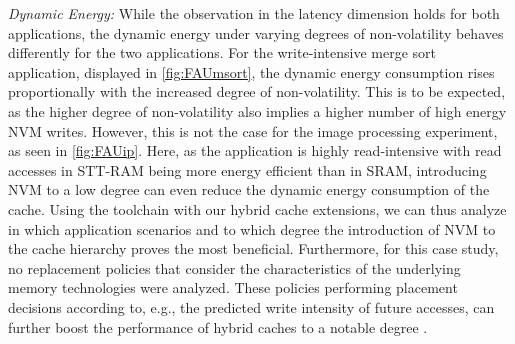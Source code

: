 \textit{Dynamic Energy:} While the observation in the latency dimension holds for both applications, the dynamic energy under varying degrees of non-volatility behaves differently for the two applications.
For the write-intensive merge sort application, displayed in \cref{fig:FAUmsort}, the dynamic energy consumption rises proportionally with the increased degree of non-volatility.
This is to be expected, as the higher degree of non-volatility also implies a higher number of high energy NVM writes.
However, this is not the case for the image processing experiment, as seen in \cref{fig:FAUip}.
Here, as the application is highly read-intensive with read accesses in STT-RAM being more energy efficient than in SRAM, introducing NVM to a low degree can even reduce the dynamic energy consumption of the cache.
Using the toolchain with our hybrid cache extensions, we can thus analyze in which application scenarios and to which degree the introduction of NVM to the cache hierarchy proves the most beneficial.
Furthermore, for this case study, no replacement policies that consider the characteristics of the underlying memory technologies were analyzed.
These policies performing placement decisions according to, e.g., the predicted write intensity of future accesses, can further boost the performance of hybrid caches to a notable degree \cite{8716297,7110550, Wilbert:2024a}.

